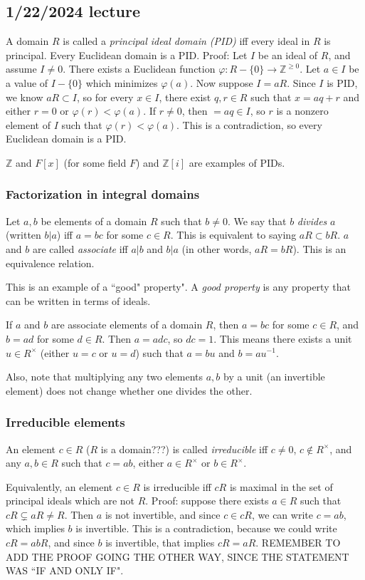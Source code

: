 \documentclass[12pt]{article}
\begin{document}
\subsection{1/22/2024 lecture}
A domain $R$ is called a \textit{principal ideal domain (PID)} iff every ideal in $R$ is principal. Every Euclidean domain is a PID. Proof: Let $I$ be an ideal of $R$, and assume $I \neq 0$. There exists a Euclidean function $\varphi: R-\{0\} \rightarrow \mathbb{Z}^{\geq 0}$. Let $a \in I$ be a value of $I - \{0\}$ which minimizes $\varphi(a)$. Now suppose $I=aR$. Since $I$ is  PID, we know $aR \subset I$, so for every $x \in I$, there exist $q,r \in R$ such that $x=aq+r$ and either $r=0$ or $\varphi(r) < \varphi(a)$. If $r \neq 0$, then $=aq \in I$, so $r$ is a nonzero element of $I$ such that $\varphi(r) < \varphi(a)$. This is a contradiction, so every Euclidean domain is a PID.
\par
$ \mathbb{Z}$ and $F[x]$ (for some field $F$) and $ \mathbb{Z}[i]$ are examples of PIDs.
\subsubsection{Factorization in integral domains}
Let $a,b$ be elements of a domain $R$ such that $b \neq 0$. We say that $b$ \textit{divides} $a$ (written $b|a$) iff $a=bc$ for some $c \in R$. This is equivalent to saying $aR \subset bR$. $a$ and $b$ are called \textit{associate} iff $a|b$ and $b|a$ (in other words, $aR=bR$). This is an equivalence relation.
\par
This is an example of a ``good" property". A \textit{good property} is any property that can be written in terms of ideals.
\par
If $a$ and $b$ are associate elements of a domain $R$, then $a=bc$ for some $c \in R$, and $b=ad$ for some $d \in R$. Then $a=adc$, so $dc=1$. This means there exists a unit $u \in R^\times$ (either $u=c$ or $u=d$) such that $a=bu$ and $b=au^{-1}$.
\par
Also, note that multiplying any two elements $a,b$ by a unit (an invertible element) does not change whether one divides the other.
\subsubsection{Irreducible elements}
An element $c \in R$ ($R$ is a domain???) is called \textit{irreducible} iff $c \neq 0$, $c \not\in R^\times$, and any $a,b \in R$ such that $c=ab$, either $a \in R^\times$ or $b \in R^\times$.
\par
Equivalently, an element $c \in R$ is irreducible iff $cR$ is maximal in the set of principal ideals which are not $R$. Proof: suppose there exists $a \in R$ such that $cR \subsetneq aR \neq R$. Then $a$ is not invertible, and since $c \in cR$, we can write $c=ab$, which implies $b$ is invertible. This is a contradiction, because we could write $cR=abR$, and since $b$ is invertible, that implies $cR=aR$. REMEMBER TO ADD THE PROOF GOING THE OTHER WAY, SINCE THE STATEMENT WAS ``IF AND ONLY IF".
\end{document}
